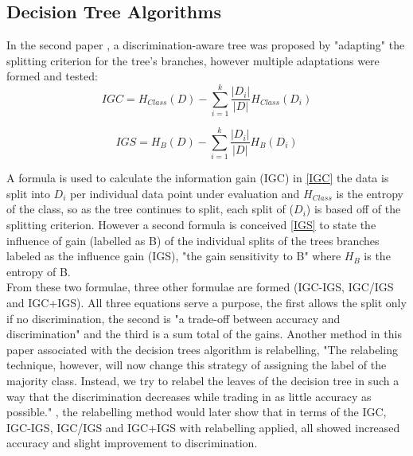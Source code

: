 \subsection{Decision Tree Algorithms}
\label{Decision Tree Algorithms Research Section}

In the second paper \cite{Tree}, a discrimination-aware tree was proposed by "adapting" the splitting criterion for the tree's branches, however multiple adaptations were formed and tested: \\

\begin{equation}
    IGC = H_{Class}(D) - \sum_{i=1}^{k} \dfrac{|D_i|}{|D|} H_{Class}(D_i)
    \label{IGC}
\end{equation}

\begin{equation}
    IGS = H_B(D) - \sum_{i=1}^{k} \dfrac{|D_i|}{|D|} H_B(D_i)
    \label{IGS}
\end{equation}
\vspace{0.5cm}

A formula is used to calculate the information gain (IGC) in \cref{IGC} the data is split into $D_i$ per individual data point under evaluation and $H_{Class}$ is the entropy of the class, so as the tree continues to split, each split of ($D_i$) is based off of the splitting criterion. However a second formula is conceived \cref{IGS} to state the influence of gain (labelled as B) of the individual splits of the trees branches labeled as the influence gain (IGS), "the gain sensitivity to B" \cite{Tree} where $H_B$ is the entropy of B. \\

From these two formulae, three other formulae are formed (IGC-IGS, IGC/IGS and IGC+IGS). All three equations serve a purpose, the first allows the split only if no discrimination, the second is "a trade-off between accuracy and discrimination" \cite{Tree} and the third is a sum total of the gains. Another method in this paper associated with the decision trees algorithm is relabelling, "The relabeling technique, however, will now change this strategy of assigning the label of the majority class. Instead, we try to relabel the leaves of the decision tree in such a way that the discrimination decreases while trading in as little accuracy as possible." \cite{Tree}, the relabelling method would later show that in terms of the IGC, IGC-IGS, IGC/IGS and IGC+IGS with relabelling applied, all showed increased accuracy and slight improvement to discrimination. \\